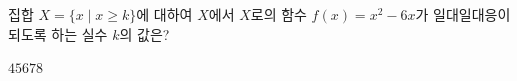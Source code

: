 집합 $X=\{x \mid x\ge k\}$에 대하여 $X$에서 $X$로의 함수 $f(x)=x^2-6x$가 일대일대응이 되도록 하는 실수 $k$의 값은?
\begin{choices32}{$4$}{$5$}{$6$}{$7$}{$8$}\end{choices32}

